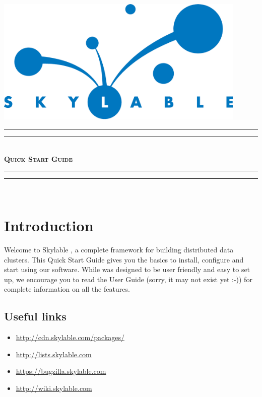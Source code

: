 \pagestyle{empty}

\begin{center}
    \includegraphics[width=120mm]{logo.eps}\\
    \vspace{4cm}
    \rule{\textwidth}{1.6pt}\vspace*{-\baselineskip}\vspace*{2pt}
    \rule{\textwidth}{0.4pt}\\[\baselineskip]
    {\fontsize{40}{50}\bfseries\scshape \SX Quick Start Guide}
    \rule{\textwidth}{0.4pt}\vspace*{-\baselineskip}\vspace{3.2pt}
    \rule{\textwidth}{1.6pt}\\[\baselineskip]
\end{center}


\LARGE
\chapter{Introduction}

\indent Welcome to Skylable \SX, a complete framework for building distributed data
clusters. This Quick Start Guide gives you the basics to install, configure
and start using our software. While \SX was designed to be user friendly and easy to
set up, we encourage you to read the User Guide (sorry, it may not exist yet :-)) for
complete information on all the
features.\\

\section*{Useful links}
\begin{itemize}
    \item \url{http://cdn.skylable.com/packages/}
    \item \url{http://lists.skylable.com}
    \item \url{https://bugzilla.skylable.com}
    \item \url{http://wiki.skylable.com}
\end{itemize}

